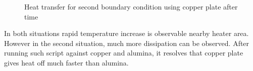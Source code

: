\documentclass[onecolumn]{article}
\begin{document}
\begin{figure}[H]
\noindent{}
\noindent{}
\caption{Heat transfer for second boundary condition using copper plate after time}
\label{fig:plate}
\end{figure}
In both situations rapid temperature increase is observable nearby heater area. However in the second situation, much more dissipation can be observed.  After running such script against copper and alumina, it resolves that copper plate gives heat off much faster than alumina.
\end{document}
